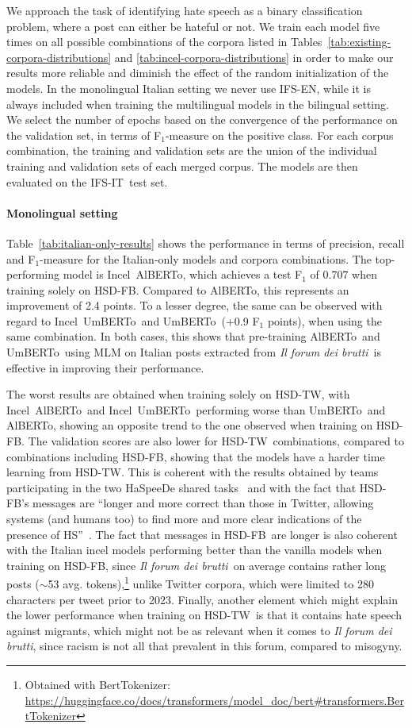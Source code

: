 \documentclass[
twocolumn,
]{ceurart}
\newcommand{\dsENclassification}{IFS-EN}
\newcommand{\dsITclassification}{IFS-IT}
\newcommand{\umbert}{\mbox{UmBERTo}}
\newcommand{\albert}{\mbox{AlBERTo}}
\newcommand{\iumbert}{\mbox{Incel UmBERTo}}
\newcommand{\ialbert}{\mbox{Incel AlBERTo}}
\newcommand{\hsdfb}{\mbox{HSD-FB}}
\newcommand{\hsdtw}{\mbox{HSD-TW}}
\newcommand{\itforum}{\textit{Il forum dei brutti}}
\begin{document}
We approach the task of identifying hate speech as a binary classification problem, where a post can either be hateful or not. We train each model five times on all possible combinations of the
corpora listed in Tables~\ref{tab:existing-corpora-distributions} and \ref{tab:incel-corpora-distributions} in order to make our results more reliable and diminish the effect of the random initialization of the models. In the monolingual Italian setting we never use \dsENclassification, while it is always included when training the multilingual models in the bilingual setting. We select the number of epochs based on the convergence of the performance on the validation
set, in terms of F$_1$-measure on the positive class. For each corpus combination, the training and validation sets are the union of the individual training and validation sets of each merged corpus. The models are then evaluated on the \dsITclassification\, test set.

\paragraph{Monolingual setting}
Table~\ref{tab:italian-only-results} shows the performance in terms of precision, recall and F$_1$-measure for the Italian-only models and corpora combinations.
The top-performing model is \ialbert, which achieves a test F$_1$ of 0.707 when training solely on \hsdfb. Compared to \albert, this represents an improvement of 2.4 points. To a lesser degree, the same can be observed with regard to \iumbert\, and \umbert\, (+0.9 F$_1$ points), when using the same combination. In both cases, this shows that pre-training \albert\, and \umbert\, using MLM on Italian posts extracted from \itforum\, is effective in improving their performance.

The worst results are obtained when training solely on \hsdtw, with \ialbert\, and \iumbert\, performing worse than \umbert\, and \albert, showing an opposite trend to the one observed when training on \hsdfb.
The validation scores are also lower for \hsdtw\, combinations, compared to combinations including \hsdfb, showing that the models have a harder time learning from \hsdtw. This is coherent with the results obtained by teams participating in the two HaSpeeDe shared tasks~\cite{boscoOverviewEVALITA2018,basileEVALITA2020Overview} and with the fact that \hsdfb's messages are ``longer and more
correct than those in Twitter, allowing systems (and humans too) to find more and more clear indications of the presence of HS''~\cite{boscoOverviewEVALITA2018}.
The fact that messages in \hsdfb\, are longer is also coherent with the Italian incel models performing better than the vanilla models when training on \hsdfb, since \itforum\, on average contains rather long posts
($\sim$53 avg. tokens),\footnote{Obtained with BertTokenizer: \url{https://huggingface.co/docs/transformers/model_doc/bert\#transformers.BertTokenizer}} unlike Twitter corpora, which were limited to 280 characters per tweet prior to 2023.
Finally, another element which might explain the lower performance when training on \hsdtw\, is that it contains hate speech against migrants, which might not be as relevant when it comes to \itforum, since racism is not all that prevalent in this forum, compared to misogyny.
\end{document}
